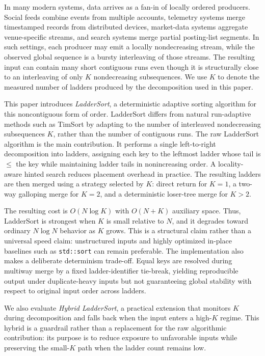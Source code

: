 \documentclass[10pt]{article}
\begin{document}
In many modern systems, data arrives as a fan-in of locally ordered producers. Social feeds combine events from multiple accounts, telemetry systems merge timestamped records from distributed devices, market-data systems aggregate venue-specific streams, and search systems merge partial posting-list segments. In such settings, each producer may emit a locally nondecreasing stream, while the observed global sequence is a bursty interleaving of those streams. The resulting input can contain many short contiguous runs even though it is structurally close to an interleaving of only \(K\) nondecreasing subsequences. We use \(K\) to denote the measured number of ladders produced by the decomposition used in this paper.

This paper introduces \emph{LadderSort}, a deterministic adaptive sorting algorithm for this noncontiguous form of order. LadderSort differs from natural run-adaptive methods such as TimSort by adapting to the number of interleaved nondecreasing subsequences \(K\), rather than the number of contiguous runs. The raw LadderSort algorithm is the main contribution. It performs a single left-to-right decomposition into ladders, assigning each key to the leftmost ladder whose tail is \(\le\) the key while maintaining ladder tails in nonincreasing order. A locality-aware hinted search reduces placement overhead in practice. The resulting ladders are then merged using a strategy selected by \(K\): direct return for \(K=1\), a two-way galloping merge for \(K=2\), and a deterministic loser-tree merge for \(K>2\).

The resulting cost is \(O(N\log K)\) with \(O(N+K)\) auxiliary space. Thus, LadderSort is strongest when \(K\) is small relative to \(N\), and it degrades toward ordinary \(N\log N\) behavior as \(K\) grows. This is a structural claim rather than a universal speed claim: unstructured inputs and highly optimized in-place baselines such as \texttt{std::sort} can remain preferable. The implementation also makes a deliberate determinism trade-off. Equal keys are resolved during multiway merge by a fixed ladder-identifier tie-break, yielding reproducible output under duplicate-heavy inputs but not guaranteeing global stability with respect to original input order across ladders.

We also evaluate \emph{Hybrid LadderSort}, a practical extension that monitors \(K\) during decomposition and falls back when the input enters a high-\(K\) regime. This hybrid is a guardrail rather than a replacement for the raw algorithmic contribution: its purpose is to reduce exposure to unfavorable inputs while preserving the small-\(K\) path when the ladder count remains low.
\end{document}
